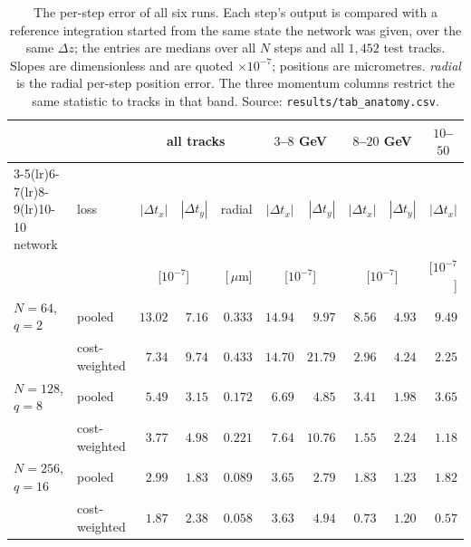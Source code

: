 \documentclass[11pt,a4paper]{article}
\newcommand{\um}{\ensuremath{\,\mu\mathrm{m}}}
\begin{document}
\begin{table}[tbp]
  \centering
  \caption{The per-step error of all six runs. Each step's output is compared
  with a reference integration started from the same state the network was
  given, over the same $\Delta z$; the entries are medians over all $N$ steps
  and all $1{,}452$ test tracks. Slopes are dimensionless and are quoted
  $\times 10^{-7}$; positions are micrometres. \emph{radial} is the radial
  per-step position error. The three momentum columns restrict the same
  statistic to tracks in that band. Source: \texttt{results/tab\_anatomy.csv}.}
  \label{tab:anatomysteps}
  \footnotesize
  \setlength{\tabcolsep}{4pt}
  \begin{tabular}{llrrrrrrrr}
    \toprule
    & & \multicolumn{3}{c}{all tracks} & \multicolumn{2}{c}{$3$--$8$ GeV}
      & \multicolumn{2}{c}{$8$--$20$ GeV} & \multicolumn{1}{c}{$10$--$50$} \\
    \cmidrule(lr){3-5}\cmidrule(lr){6-7}\cmidrule(lr){8-9}\cmidrule(lr){10-10}
    network & loss & $|\Delta t_x|$ & $|\Delta t_y|$ & radial
      & $|\Delta t_x|$ & $|\Delta t_y|$ & $|\Delta t_x|$ & $|\Delta t_y|$
      & $|\Delta t_x|$ \\
    & & \multicolumn{2}{c}{[$10^{-7}$]} & [\!\um]
      & \multicolumn{2}{c}{[$10^{-7}$]} & \multicolumn{2}{c}{[$10^{-7}$]}
      & [$10^{-7}$] \\
    \midrule
    $N = 64$, $q = 2$   & pooled        & $13.02$ & $7.16$ & $0.333$ & $14.94$ & $9.97$  & $8.56$ & $4.93$ & $9.49$ \\
                        & cost-weighted & $7.34$  & $9.74$ & $0.433$ & $14.70$ & $21.79$ & $2.96$ & $4.24$ & $2.25$ \\
    \addlinespace
    $N = 128$, $q = 8$  & pooled        & $5.49$  & $3.15$ & $0.172$ & $6.69$  & $4.85$  & $3.41$ & $1.98$ & $3.65$ \\
                        & cost-weighted & $3.77$  & $4.98$ & $0.221$ & $7.64$  & $10.76$ & $1.55$ & $2.24$ & $1.18$ \\
    \addlinespace
    $N = 256$, $q = 16$ & pooled        & $2.99$  & $1.83$ & $0.089$ & $3.65$  & $2.79$  & $1.83$ & $1.23$ & $1.82$ \\
                        & cost-weighted & $1.87$  & $2.38$ & $0.058$ & $3.63$  & $4.94$  & $0.73$ & $1.20$ & $0.57$ \\
    \bottomrule
  \end{tabular}
\end{table}
\end{document}
